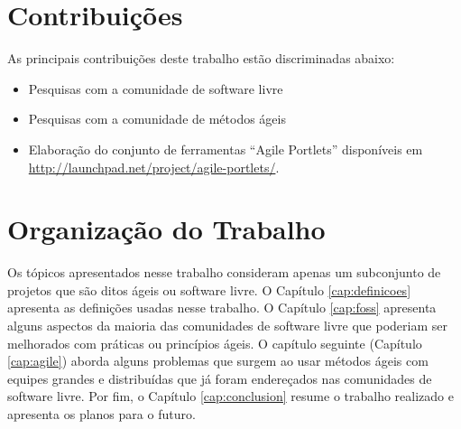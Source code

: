 \section{Contribuições}
\label{sec:contribucoes}

As principais contribuições deste trabalho estão discriminadas abaixo:

\begin{itemize}
\item Pesquisas com a comunidade de software livre
\item Pesquisas com a comunidade de métodos ágeis
\item Elaboração do conjunto de ferramentas ``Agile Portlets''
  disponíveis em \url{http://launchpad.net/project/agile-portlets/}.
\end{itemize}

\section{Organização do Trabalho}
\label{sec:organizacao_trabalho}

Os tópicos apresentados nesse trabalho consideram apenas um
subconjunto de projetos que são ditos ágeis ou software livre. O
Capítulo \ref{cap:definicoes} apresenta as definições usadas nesse
trabalho. O Capítulo \ref{cap:foss} apresenta alguns aspectos da
maioria das comunidades de software livre que poderiam ser melhorados
com práticas ou princípios ágeis. O capítulo seguinte (Capítulo
\ref{cap:agile}) aborda alguns problemas que surgem ao usar métodos
ágeis com equipes grandes e distribuídas que já foram endereçados nas
comunidades de software livre. Por fim, o Capítulo
\ref{cap:conclusion} resume o trabalho realizado e apresenta os planos
para o futuro.
